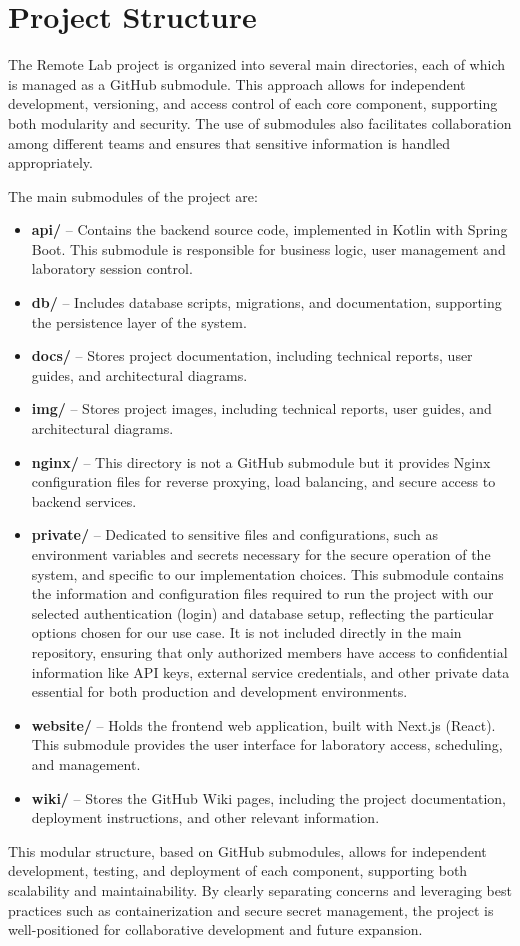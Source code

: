 \section{Project Structure}

The Remote Lab project is organized into several main directories, each of which is managed as a GitHub submodule. This approach allows for independent development, versioning, and access control of each core component, supporting both modularity and security. The use of submodules also facilitates collaboration among different teams and ensures that sensitive information is handled appropriately.

The main submodules of the project are:

\begin{itemize}
    \item \textbf{api/} -- Contains the backend source code, implemented in Kotlin with Spring Boot. This submodule is responsible for business logic, user management and laboratory session control.
    \item \textbf{db/} -- Includes database scripts, migrations, and documentation, supporting the persistence layer of the system.
    \item \textbf{docs/} -- Stores project documentation, including technical reports, user guides, and architectural diagrams.
    \item \textbf{img/} -- Stores project images, including technical reports, user guides, and architectural diagrams.
    \item \textbf{nginx/} -- This directory is not a GitHub submodule but it provides Nginx configuration files for reverse proxying, load balancing, and secure access to backend services.
    \item \textbf{private/} -- Dedicated to sensitive files and configurations, such as environment variables and secrets necessary for the secure operation of the system, and specific to our implementation choices. This submodule contains the information and configuration files required to run the project with our selected authentication (login) and database setup, reflecting the particular options chosen for our use case. It is not included directly in the main repository, ensuring that only authorized members have access to confidential information like API keys, external service credentials, and other private data essential for both production and development environments.
    \item \textbf{website/} -- Holds the frontend web application, built with Next.js (React). This submodule provides the user interface for laboratory access, scheduling, and management.
    \item \textbf{wiki/} -- Stores the GitHub Wiki pages, including the project documentation, deployment instructions, and other relevant information.
\end{itemize}

This modular structure, based on GitHub submodules, allows for independent development, testing, and deployment of each component, supporting both scalability and maintainability. By clearly separating concerns and leveraging best practices such as containerization and secure secret management, the project is well-positioned for collaborative development and future expansion. 